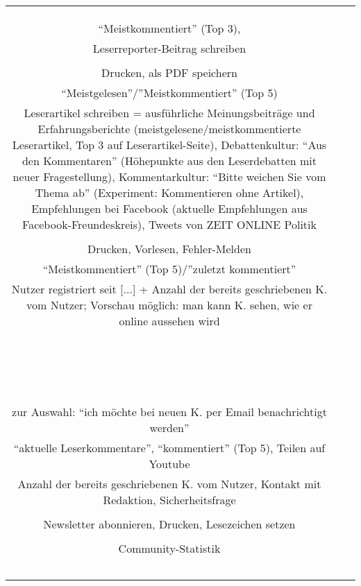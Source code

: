 \begin{landscape}
\begin{tabular}{ccc}
{{		\\
		&
		\\
		\\
		``Meistkommentiert''  (Top 3), \\
		Leserreporter-Beitrag schreiben \\
		&
		\\
		Drucken, als PDF speichern\\
		``Meistgelesen''/''Meistkommentiert'' (Top 5)\\
		Leserartikel schreiben = ausführliche Meinungsbeiträge und Erfahrungsberichte (meistgelesene/meistkommentierte Leserartikel, Top 3 auf Leserartikel-Seite), Debattenkultur: ``Aus den Kommentaren'' (Höhepunkte aus den Leserdebatten mit neuer Fragestellung), Kommentarkultur: ``Bitte weichen Sie vom Thema ab'' (Experiment: Kommentieren ohne Artikel), Empfehlungen bei Facebook (aktuelle Empfehlungen aus Facebook-Freundeskreis), Tweets von ZEIT ONLINE Politik\\
		&
		\\
		Drucken, Vorlesen, Fehler-Melden\\
		``Meistkommentiert'' (Top 5)/''zuletzt kommentiert''\\
		Nutzer registriert seit [...] + Anzahl der bereits geschriebenen K. vom Nutzer; Vorschau möglich: man kann K. sehen, wie er online aussehen wird\\
		&
		\\
		\\
		\\
		\\
		&
		\\
		\\
		\\
		\\
		&
		\\
		\\
		\\
		\\
		&
		\\
		\\
		\\
		\\
		&
		\\
		zur Auswahl: ``ich möchte bei neuen K. per Email benachrichtigt werden'' \\
		``aktuelle Leserkommentare'', ``kommentiert'' (Top 5), Teilen auf Youtube\\
		Anzahl der bereits geschriebenen K. vom Nutzer, Kontakt mit Redaktion, Sicherheitsfrage\\
		&
		\\
		Newsletter abonnieren, Drucken, Lesezeichen setzen\\
		\\
		Community-Statistik\\
		&
		\\
		\\
		\\
		\\
		&
		
}}
\end{tabular}
\end{landscape}
